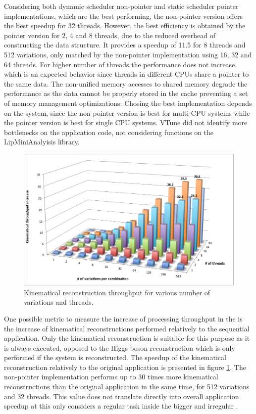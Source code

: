 Considering both dynamic scheduler non-pointer and static scheduler pointer implementations, which are the best performing, the non-pointer version offers the best speedup for 32 threads. However, the best efficiency is obtained by the pointer version for 2, 4 and 8 threads, due to the reduced overhead of constructing the data structure. It provides a speedup of 11.5 for 8 threads and 512 variations, only matched by the non-pointer implementation using 16, 32 and 64 threads. For higher number of threads the performance does not increase, which is an expected behavior since threads in different CPUs share a pointer to the same data. The non-unified memory accesses to shared memory degrade the performance as the data cannot be properly stored in the cache preventing a set of memory management optimizations. Chosing the best implementation depends on the system, since the non-pointer version is best for multi-CPU systems while the pointer version is best for single CPU systems. VTune did not identify more bottlenecks on the application code, not considering functions on the LipMiniAnalyisis library.

\begin{figure}[!htp]
	\begin{center}
		\includegraphics[scale=0.6]{../../common/graphs/dilep_throughput.png}
		\caption{Kinematical reconstruction throughput for various number of variations and threads.}
		\label{fig:DilepThroughput}
	\end{center}
\end{figure}

One possible metric to measure the increase of processing throughput in the \ttDilepKinFit is the increase of kinematical reconstructions performed relatively to the sequential application. Only the kinematical reconstruction is suitable for this purpose as it is always executed, opposed to the Higgs boson reconstruction which is only performed if the \ttbar system is reconstructed. The speedup of the kinematical reconstruction relatively to the original application is presented in figure \ref{fig:DilepThroughput}. The non-pointer implementation performs up to 30 times more kinematical reconstructions than the original application in the same time, for 512 variations and 32 threads. This value does not translate directly into overall application speedup at this only considers a regular task inside the bigger and irregular \ttDilepKinFit.

